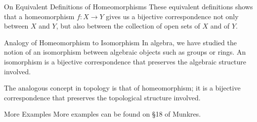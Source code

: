 
\begin{remarkBox}{On Equivalent Definitions of Homeomorphisms}
    These equivalent definitions shows that a homeomorphism 
    \( f: X \rightarrow Y \) gives us a bijective correspondence not only
    between \( X \) and \( Y \), but also between the collection of open sets
    of \( X \) and of \( Y \).
\end{remarkBox}

\begin{remarkBox}{Analogy of Homeomorphism to Isomorphism}
    In algebra, we have studied the notion of an isomorphism between algebraic 
    objects such as groups or rings.
    An isomorphism is a bijective correspondence that preserves the algebraic
    structure involved.

    \baseSkip

    The analogous concept in topology is that of homeomorphism; it is a 
    bijective correspondence that preserves the topological structure involved.
\end{remarkBox}

\begin{remarkBox}{More Examples}
    More examples can be found on \S 18 of Munkres.
\end{remarkBox}